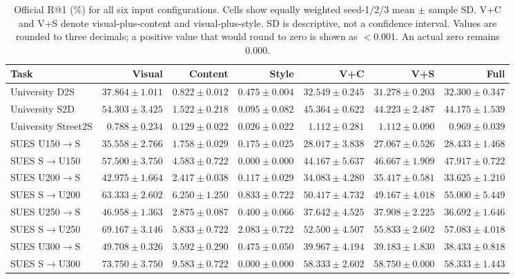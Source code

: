 \begin{table}[!t]
\centering
\caption{Official R@1 (\%) for all six input configurations. Cells show equally weighted seed-1/2/3 mean $\pm$ sample SD. V+C and V+S denote visual-plus-content and visual-plus-style. SD is descriptive, not a confidence interval. Values are rounded to three decimals; a positive value that would round to zero is shown as $<0.001$. An actual zero remains 0.000.}
\label{tab:semantic-r1}
\footnotesize
\setlength{\tabcolsep}{3pt}
\begin{tabular}{lrrrrrr}
\toprule
Task & Visual & Content & Style & V+C & V+S & Full \\
\midrule
University D2S & $37.864\pm1.011$ & $0.822\pm0.012$ & $0.475\pm0.004$ & $32.549\pm0.245$ & $31.278\pm0.203$ & $32.300\pm0.347$ \\
University S2D & $54.303\pm3.425$ & $1.522\pm0.218$ & $0.095\pm0.082$ & $45.364\pm0.622$ & $44.223\pm2.487$ & $44.175\pm1.539$ \\
University Street2S & $0.788\pm0.234$ & $0.129\pm0.022$ & $0.026\pm0.022$ & $1.112\pm0.281$ & $1.112\pm0.090$ & $0.969\pm0.039$ \\
\midrule
SUES U150$\to$S & $35.558\pm2.766$ & $1.758\pm0.029$ & $0.175\pm0.025$ & $28.017\pm3.838$ & $27.067\pm0.526$ & $28.433\pm1.468$ \\
SUES S$\to$U150 & $57.500\pm3.750$ & $4.583\pm0.722$ & $0.000\pm0.000$ & $44.167\pm5.637$ & $46.667\pm1.909$ & $47.917\pm0.722$ \\
SUES U200$\to$S & $42.975\pm1.664$ & $2.417\pm0.038$ & $0.117\pm0.029$ & $34.083\pm4.280$ & $35.417\pm0.581$ & $33.625\pm1.210$ \\
SUES S$\to$U200 & $63.333\pm2.602$ & $6.250\pm1.250$ & $0.833\pm0.722$ & $50.417\pm4.732$ & $49.167\pm4.018$ & $55.000\pm5.449$ \\
SUES U250$\to$S & $46.958\pm1.363$ & $2.875\pm0.087$ & $0.400\pm0.066$ & $37.642\pm4.525$ & $37.908\pm2.225$ & $36.692\pm1.646$ \\
SUES S$\to$U250 & $69.167\pm3.146$ & $5.833\pm0.722$ & $2.083\pm0.722$ & $52.500\pm4.507$ & $55.833\pm2.602$ & $57.083\pm4.018$ \\
SUES U300$\to$S & $49.708\pm0.326$ & $3.592\pm0.290$ & $0.475\pm0.050$ & $39.967\pm4.194$ & $39.183\pm1.830$ & $38.433\pm0.818$ \\
SUES S$\to$U300 & $73.750\pm3.750$ & $9.583\pm0.722$ & $0.000\pm0.000$ & $58.333\pm2.602$ & $58.750\pm0.000$ & $58.333\pm1.443$ \\
\bottomrule
\end{tabular}
\end{table}
